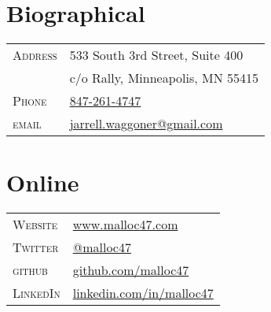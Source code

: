 \documentclass[10pt]{article}
\begin{document}
\pagestyle{empty}


\par{\bigskip\par}



\begin{multicols}{2}
\setlength{\parskip}{0pt}
  \section{Biographical}

\begin{tabularx}{\linewidth}{@{}l X@{}}
  \textsc{Address}     & \small{533 South 3rd Street, Suite 400} \\
                       & \small{c/o Rally, Minneapolis, MN 55415} \\
  \textsc{Phone}       & \href{tel:847-261-4747}{847-261-4747} \\
  \textsc{email}       & \href{mailto:jarrell.waggoner@gmail.com}{jarrell.waggoner@gmail.com} \\
\end{tabularx}

\vfill
\columnbreak

\section{Online}
\begin{tabularx}{\linewidth}{@{}l X@{}}
  \textsc{Website}     & \href{http://www.malloc47.com}{www.malloc47.com} \\
  \textsc{Twitter}     & \href{https://twitter.com/malloc47}{@malloc47} \\
  \textsc{github}      & \href{http://www.github.com/malloc47}{github.com/malloc47}\\
  \textsc{LinkedIn}    & \href{http://www.linkedin.com/in/malloc47}{linkedin.com/in/malloc47} \\
\end{tabularx}

\end{multicols}
\end{document}
